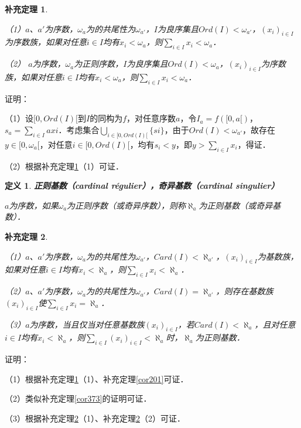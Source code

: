 \documentclass[12pt, a4paper, oneside]{book}
\newtheorem{cor}{补充定理}
\newtheorem{de}{定义}
\begin{document}
			\begin{cor}\label{cor380}
				\hfill\par
				（1）$a$、$a'$为序数，$\omega_a$为的共尾性为$\omega_{a'}$，$I$为良序集且$Ord(I)<\omega_{a'}$，$(x_i)_{i\in I}$为序数族，如果对任意$i\in I$均有$x_i<\omega_a$，则$\sum\limits_{i\in I}x_i<\omega_a$．
				\par
				（2）	$a$为序数，$\omega_a$为正则序数，$I$为良序集且$Ord(I)<\omega_a$，$(x_i)_{i\in I}$为序数族，如果对任意$i\in I$均有$x_i<\omega_a$，则$\sum\limits_{i\in I}x_i<\omega_a$．
			\end{cor}
			证明：
			\par
			（1）设$[0, Ord(I)[$到$I$的同构为$f$，对任意序数$a$，令$I_a=f([0, a[)$，$s_a=\sum\limits_{i\in I}axi$．考虑集合$\bigcup\limits_{i\in [0, Ord(I)[}\{si\}$，由于$Ord(I)<\omega_{a'}$，故存在$y\in [0, \omega_a[$，对任意$i\in [0, Ord(I)[$，均有$s_i<y$，即$y>\sum\limits_{i\in I}x_i$，得证．
			\par
			（2）根据补充定理\ref{cor380}（1）可证．
			
			\begin{de}
				\textbf{正则基数（cardinal régulier），奇异基数（cardinal singulier）}
				\par
				$a$为序数，如果$\omega_a$为正则序数（或奇异序数），则称$\aleph_a$为正则基数（或奇异基数）．
			\end{de}
			
			\begin{cor}\label{cor381}
				\hfill\par
				（1）$a$、$a'$为序数，$\omega_a$为的共尾性为$\omega_{a'}$，$Card(I)<\aleph_{a'}$，$(x_i)_{i\in I}$为基数族，如果对任意$i\in I$均有$x_i<\aleph_a$，则$\sum\limits_{i\in I}x_i<\aleph_a$．
				\par
				（2）$a$、$a'$为序数，$\omega_a$为的共尾性为$\omega_{a'}$，$Card(I)=\aleph_{a'}$，则存在基数族$(x_i)_{i\in I}$使$\sum\limits_{i\in I}x_i=\aleph_a$．
				\par
				（3）$a$为序数，当且仅当对任意基数族$(x_i)_{i\in I}$，若$Card(I)<\aleph_a$，且对任意$i\in I$均有$x_i<\aleph_a$，则$\sum\limits_{i\in I}(x_i)_{i\in I}<\aleph_a$时，$\aleph_a$为正则基数．
			\end{cor}
			证明：
			\par
			（1）根据补充定理\ref{cor380}（1）、补充定理\ref{cor201}可证．
			\par
			（2）类似补充定理\ref{cor373}的证明可证．
			\par
			（3）根据补充定理\ref{cor381}（1）、补充定理\ref{cor381}（2）可证．
			
\end{document}
